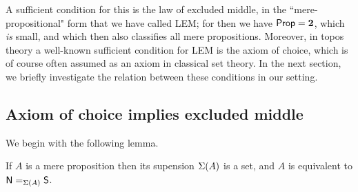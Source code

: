 A sufficient condition for this is the law of excluded middle, in the ``mere-propositional" form that we have called LEM; for then we have $\prop = \bool$, which \emph{is} small, and which then also classifies all mere propositions.
Moreover, in topos theory a well-known sufficient condition for LEM is the axiom of choice, which is of course often assumed as an axiom in classical set theory.
In the next section, we briefly investigate the relation between these conditions in our setting.


\subsection{Axiom of choice implies excluded middle}
\label{subsec:emacinsets}


We begin with the following lemma.

\begin{lem}\label{prop:trunc_of_prop_is_set}
If $A$ is a mere proposition then its supension $\susp(A)$ is a set,
and $A$ is equivalent to $\id[\susp(A)]{\north}{\south}$.
\end{lem}

